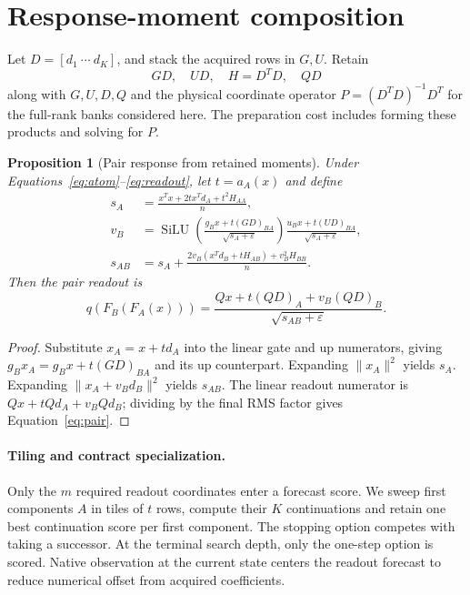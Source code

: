 \documentclass[11pt]{article}
\newtheorem{proposition}{Proposition}
\newcommand{\silu}{\operatorname{SiLU}}
\newcommand{\eps}{\varepsilon}
\begin{document}
\section{Response-moment composition}
Let $D=[d_1\ \cdots\ d_K]$, and stack the acquired rows in $G,U$. Retain
\begin{equation}
 GD,\quad UD,\quad H=D^TD,\quad QD
\end{equation}
along with $G,U,D,Q$ and the physical coordinate operator $P=(D^TD)^{-1}D^T$
for the full-rank banks considered here. The preparation cost includes forming
these products and solving for $P$.

\begin{proposition}[Pair response from retained moments]
Under Equations~\eqref{eq:atom}--\eqref{eq:readout}, let $t=a_A(x)$ and define
\begin{align}
 s_A&=\frac{x^Tx+2t x^Td_A+t^2H_{AA}}{n},\\
 v_B&=\silu\!\left(\frac{g_Bx+t(GD)_{BA}}{\sqrt{s_A+\eps}}\right)
             \frac{u_Bx+t(UD)_{BA}}{\sqrt{s_A+\eps}},\\
 s_{AB}&=s_A+\frac{2v_B(x^Td_B+tH_{AB})+v_B^2H_{BB}}{n}.
\end{align}
Then the pair readout is
\begin{equation}
 q(F_B(F_A(x)))=
 \frac{Qx+t(QD)_A+v_B(QD)_B}{\sqrt{s_{AB}+\eps}}.\label{eq:pair}
\end{equation}
\end{proposition}
\begin{proof}
Substitute $x_A=x+td_A$ into the linear gate and up numerators, giving
$g_Bx_A=g_Bx+t(GD)_{BA}$ and its up counterpart. Expanding
$\|x_A\|^2$ yields $s_A$. Expanding $\|x_A+v_Bd_B\|^2$ yields $s_{AB}$.
The linear readout numerator is $Qx+tQd_A+v_BQd_B$; dividing by the final
RMS factor gives Equation~\eqref{eq:pair}.
\end{proof}

\paragraph{Tiling and contract specialization.}
Only the $m$ required readout coordinates enter a forecast score. We sweep first
components $A$ in tiles of $t$ rows, compute their $K$ continuations and retain
one best continuation score per first component. The stopping option competes
with taking a successor. At the terminal search depth, only the one-step option
is scored. Native observation at the current state centers the readout forecast
to reduce numerical offset from acquired coefficients.
\end{document}
